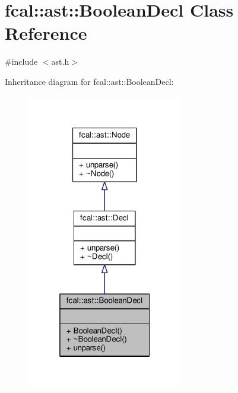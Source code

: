 \hypertarget{classfcal_1_1ast_1_1BooleanDecl}{}\section{fcal\+:\+:ast\+:\+:Boolean\+Decl Class Reference}
\label{classfcal_1_1ast_1_1BooleanDecl}


{\ttfamily \#include $<$ast.\+h$>$}



Inheritance diagram for fcal\+:\+:ast\+:\+:Boolean\+Decl\+:
\nopagebreak
\begin{figure}[H]
\begin{center}
\leavevmode
\includegraphics[width=193pt]{classfcal_1_1ast_1_1BooleanDecl__inherit__graph}
\end{center}
\end{figure}


